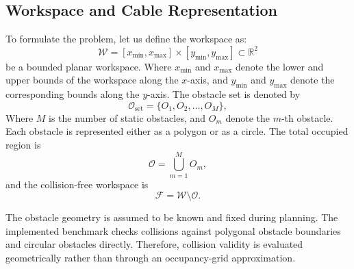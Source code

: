 \documentclass{pas}
\begin{document}
\subsection{Workspace and Cable Representation}
\label{subsec:workspace_obstacles}

To formulate the problem, let us define the workspace as:
\begin{equation}
\mathcal{W}
=
[x_{\min},x_{\max}]
\times
[y_{\min},y_{\max}]
\subset \mathbb{R}^{2}
\label{eq:workspace_rectangle}
\end{equation}
be a bounded planar workspace. 
Where \(x_{\min}\) and \(x_{\max}\) denote the lower and upper bounds of the
workspace along the \(x\)-axis, and \(y_{\min}\) and \(y_{\max}\) denote
the corresponding bounds along the \(y\)-axis.
 The obstacle set is denoted by
\begin{equation}
\mathcal{O}_{\mathrm{set}}
=
\{O_1,O_2,\ldots,O_M\},
\label{eq:obstacle_set}
\end{equation}
Where \(M\) is the number of static obstacles, and \(O_m\) denote the
\(m\)-th obstacle.
Each obstacle is represented either as a polygon or as a circle. The total occupied region is
\begin{equation}
\mathcal{O}
=
\bigcup_{m=1}^{M} O_m ,
\label{eq:obstacle_union}
\end{equation}
and the collision-free workspace is
\begin{equation}
\mathcal{F}
=
\mathcal{W}\setminus \mathcal{O}.
\label{eq:workspace_free_region}
\end{equation}

The obstacle geometry is assumed to be known and fixed during planning. The implemented benchmark checks collisions against polygonal obstacle boundaries and circular obstacles directly. Therefore, collision validity is evaluated geometrically rather than through an occupancy-grid approximation.
\end{document}
